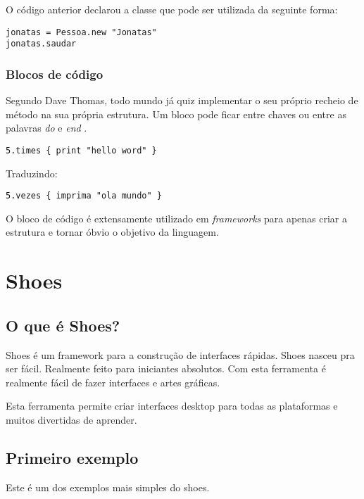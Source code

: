 \documentclass[espaco=simples,appendix=Name]{abnt}
\begin{document}
O código anterior declarou a classe que pode ser utilizada da seguinte forma:

\begin{lstlisting}[caption=Exemplo de utilização da classe descrita acima ]
jonatas = Pessoa.new "Jonatas"
jonatas.saudar 
\end{lstlisting}

\subsection { Blocos de código }

\cite{programmingRuby}
Segundo Dave Thomas, todo mundo já quiz implementar o seu próprio recheio de método na sua própria estrutura. Um bloco pode ficar entre chaves ou entre as palavras \textit{ do } e \textit{ end }.

\begin{lstlisting}[caption=Exemplo de bloco de código ]
   5.times { print "hello word" }
\end{lstlisting}

Traduzindo: 
\begin{lstlisting}[caption=Exemplo de bloco de código ]
   5.vezes { imprima "ola mundo" }
\end{lstlisting}

O bloco de código é extensamente utilizado em \textit{frameworks} para apenas criar a estrutura e tornar óbvio o objetivo da linguagem.


\chapter{ Shoes }

\section{O que é Shoes?}

Shoes é um framework para a construção de interfaces rápidas. Shoes nasceu pra ser fácil. Realmente feito para iniciantes absolutos. Com esta ferramenta é realmente fácil de fazer interfaces e artes gráficas. 

Esta ferramenta permite criar interfaces desktop para todas as plataformas e muitos divertidas de aprender.

\section{ Primeiro exemplo }

Este é um dos exemplos mais simples do shoes. 
\end{document}
